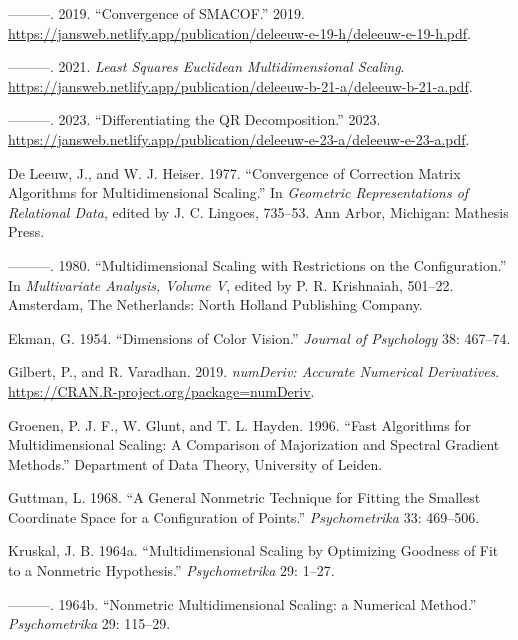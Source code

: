 \documentclass[
  12pt,
]{article}
\newlength{\cslhangindent}
\newenvironment{CSLReferences}[2] %
 {\begin{list}{}{%
  \setlength{\itemindent}{0pt}
  \setlength{\leftmargin}{0pt}
  \setlength{\parsep}{0pt}
  \ifodd #1
   \setlength{\leftmargin}{\cslhangindent}
   \setlength{\itemindent}{-1\cslhangindent}
  \fi
  \setlength{\itemsep}{#2\baselineskip}}}
 {\end{list}}
\begin{document}
\begin{CSLReferences}{1}{0}
---------. 2019. {``{Convergence of SMACOF}.''} 2019. \url{https://jansweb.netlify.app/publication/deleeuw-e-19-h/deleeuw-e-19-h.pdf}.

---------. 2021. \emph{Least Squares Euclidean Multidimensional Scaling}. \url{https://jansweb.netlify.app/publication/deleeuw-b-21-a/deleeuw-b-21-a.pdf}.

---------. 2023. {``Differentiating the QR Decomposition.''} 2023. \url{https://jansweb.netlify.app/publication/deleeuw-e-23-a/deleeuw-e-23-a.pdf}.

De Leeuw, J., and W. J. Heiser. 1977. {``Convergence of Correction Matrix Algorithms for Multidimensional Scaling.''} In \emph{Geometric Representations of Relational Data}, edited by J. C. Lingoes, 735--53. Ann Arbor, Michigan: Mathesis Press.

---------. 1980. {``Multidimensional Scaling with Restrictions on the Configuration.''} In \emph{Multivariate Analysis, Volume {V}}, edited by P. R. Krishnaiah, 501--22. Amsterdam, The Netherlands: North Holland Publishing Company.

Ekman, G. 1954. {``{Dimensions of Color Vision}.''} \emph{Journal of Psychology} 38: 467--74.

Gilbert, P., and R. Varadhan. 2019. \emph{{numDeriv: Accurate Numerical Derivatives}}. \url{https://CRAN.R-project.org/package=numDeriv}.

Groenen, P. J. F., W. Glunt, and T. L. Hayden. 1996. {``Fast Algorithms for Multidimensional Scaling: A Comparison of Majorization and Spectral Gradient Methods.''} Department of Data Theory, University of Leiden.

Guttman, L. 1968. {``{A General Nonmetric Technique for Fitting the Smallest Coordinate Space for a Configuration of Points}.''} \emph{Psychometrika} 33: 469--506.

Kruskal, J. B. 1964a. {``{Multidimensional Scaling by Optimizing Goodness of Fit to a Nonmetric Hypothesis}.''} \emph{Psychometrika} 29: 1--27.

---------. 1964b. {``{Nonmetric Multidimensional Scaling: a Numerical Method}.''} \emph{Psychometrika} 29: 115--29.


\end{CSLReferences}
\end{document}
